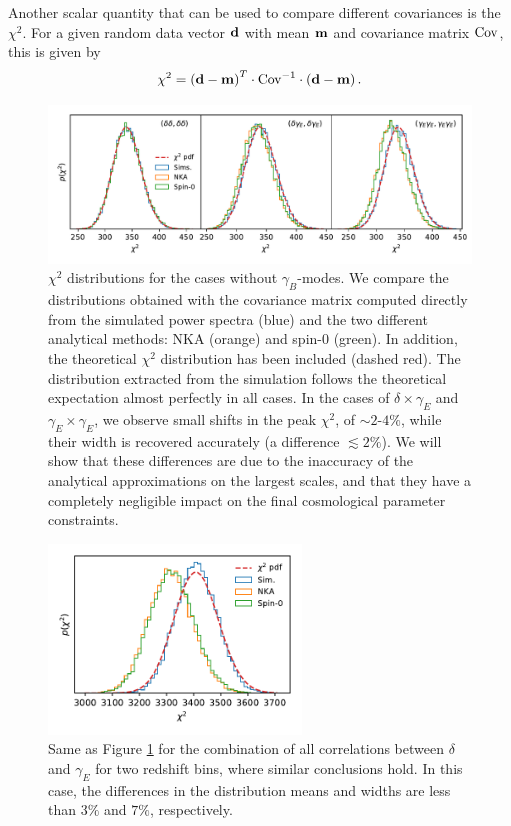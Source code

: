\documentclass[a4paper,11pt]{article}
\begin{document}
      Another scalar quantity that can be used to compare different covariances is the $\chi^2$. For a given random data vector ${\bf d}$ with mean ${\bf m}$ and covariance matrix ${\rm Cov}$, this is given by
      \begin{equation}
        \chi^2=\left({\bf d}-{\bf m}\right)^T\cdot{\rm Cov}^{-1}\cdot\left({\bf d}-{\bf m}\right).
      \end{equation}
      \begin{figure}
        \centering
        \includegraphics[width=\textwidth]{./figures/run_sph_2b_1stbin_chi2_TT_TE_EE.pdf}
        \caption{$\chi^2$ distributions for the cases without $\gamma_B$-modes. We compare the distributions obtained with the covariance matrix computed directly from the simulated power spectra (blue) and the two different analytical methods: NKA (orange) and spin-0 (green). In addition, the theoretical $\chi^2$ distribution has been included (dashed red). The distribution extracted from the simulation follows the theoretical expectation almost perfectly in all cases. In the cases of $\delta\times\gamma_E$ and $\gamma_E\times\gamma_E$, we observe small shifts in the peak $\chi^2$, of $\sim2$-$4\%$, while their width is recovered accurately (a difference $\lesssim 2\%$). We will show that these differences are due to the inaccuracy of the analytical approximations on the largest scales, and that they have a completely negligible impact on the final cosmological parameter constraints.} 
        \label{fig:chi2_1bin}
      \end{figure}
      \begin{figure}
        \centering
        \includegraphics[width=0.6\textwidth]{./figures/run_sph_2b_Spin0_NKA_TTTEEE_Full_chi2.pdf}
        \caption{Same as Figure \ref{fig:chi2_1bin} for the combination of all correlations between $\delta$ and $\gamma_E$ for two redshift bins, where similar conclusions hold. In this case, the differences in the distribution means and widths are less than $3\%$ and $7\%$, respectively.}
        \label{fig:chi2_2bins}
      \end{figure}
\end{document}
